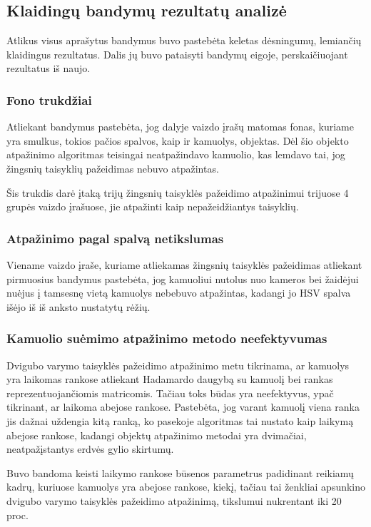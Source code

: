 \documentclass{VUMIFPSbakalaurinis}
\begin{document}
{\subsection{Klaidingų bandymų rezultatų analizė}

Atlikus visus aprašytus bandymus buvo pastebėta keletas dėsningumų, lemiančių klaidingus rezultatus. Dalis jų buvo pataisyti bandymų eigoje, perskaičiuojant rezultatus iš naujo.

\subsubsection{Fono trukdžiai}

Atliekant bandymus pastebėta, jog dalyje vaizdo įrašų matomas fonas, kuriame yra smulkus, tokios pačios spalvos, kaip ir kamuolys, objektas. Dėl šio objekto atpažinimo algoritmas teisingai neatpažindavo kamuolio, kas lemdavo tai, jog žingsnių taisyklių pažeidimas nebuvo atpažintas. 

Šis trukdis darė įtaką trijų žingsnių taisyklės pažeidimo atpažinimui trijuose 4 grupės vaizdo įrašuose, jie atpažinti kaip nepažeidžiantys taisyklių. 

\subsubsection{Atpažinimo pagal spalvą netikslumas}

Viename vaizdo įraše, kuriame atliekamas žingsnių taisyklės pažeidimas atliekant pirmuosius bandymus pastebėta, jog kamuoliui nutolus nuo kameros bei žaidėjui nuėjus į tamsesnę vietą kamuolys nebebuvo atpažintas, kadangi jo HSV spalva išėjo iš iš anksto nustatytų rėžių.  

\subsubsection{Kamuolio suėmimo atpažinimo metodo neefektyvumas}

Dvigubo varymo taisyklės pažeidimo atpažinimo metu tikrinama, ar kamuolys yra laikomas rankose atliekant Hadamardo daugybą su kamuolį bei rankas reprezentuojančiomis matricomis. Tačiau toks būdas yra neefektyvus, ypač tikrinant, ar laikoma abejose rankose. Pastebėta, jog varant kamuolį viena ranka jis dažnai uždengia kitą ranką, ko pasekoje algoritmas tai nustato kaip laikymą abejose rankose, kadangi objektų atpažinimo metodai yra dvimačiai, neatpažįstantys erdvės gylio skirtumų.

Buvo bandoma keisti laikymo rankose būsenos parametrus padidinant reikiamų kadrų, kuriuose kamuolys yra abejose rankose, kiekį, tačiau tai ženkliai apsunkino dvigubo varymo taisyklės pažeidimo atpažinimą, tikslumui nukrentant iki 20 proc.

}
\end{document}
